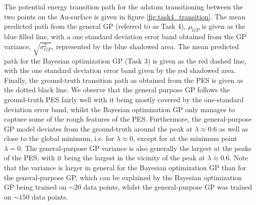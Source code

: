 \documentclass[11pt,a4paper]{article}
\begin{document}
The potential energy transition path for the adatom transitioning between the two points on the Au-surface is given in figure \ref{fig:task4_transition}. The mean predicted path from the general GP (referred to as Task 4), $\mu_{GP}$ is given as the blue filled line, with a one standard deviation error band obtained from the GP variance, $\sqrt{\sigma^2_{GP}}$, represented by the blue shadowed area. The mean predicted path for the Bayesian optimization GP (Task 3) is given as the red dashed line, with the one standard deviation error band given by the red shadowed area. Finally, the ground-truth transition path as obtained from the PES is given as the dotted black line. We observe that the general purpose GP follows the ground-truth PES fairly well with it being mostly covered by the one-standard deviation error band, whilst the Bayesian optimization GP only manages to capture some of the rough features of the PES. Furthermore, the general-purpose GP model deviates from the ground-truth around the peak at $\lambda\approx0.6$ as well as close to the global minimum, i.e. for $\lambda\approx 0$, except for at the minimum point $\lambda = 0$. The general-purpose GP variance is also generally the largest at the peaks of the PES, with it being the largest in the vicinity of the peak at $\lambda\approx0.6$. Note that the variance is larger in general for the Bayesian optimization GP than for the general-purpose GP, which can be explained by the Bayesian optimization GP being trained on $\sim20$ data points, whilst the general-purpose GP was trained on $\sim 150$ data points.
\end{document}
